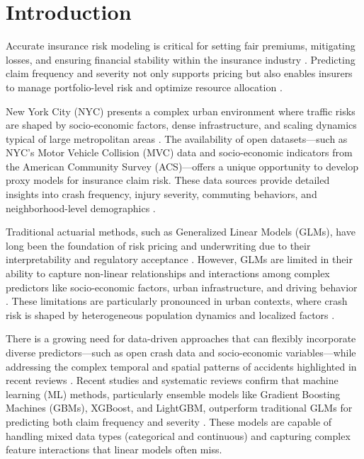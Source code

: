 \documentclass[
  number,
  review,
  3p]{elsarticle}
\begin{document}
\section{Introduction}\label{introduction}

Accurate insurance risk modeling is critical for setting fair premiums,
mitigating losses, and ensuring financial stability within the insurance
industry \citep{henckaerts, clemente}. Predicting claim frequency and
severity not only supports pricing but also enables insurers to manage
portfolio-level risk and optimize resource allocation \citep{mohamed}.

New York City (NYC) presents a complex urban environment where traffic
risks are shaped by socio-economic factors, dense infrastructure, and
scaling dynamics typical of large metropolitan areas
\citep{cabrera, bettencourt}. The availability of open datasets---such
as NYC's Motor Vehicle Collision (MVC) data and socio-economic
indicators from the American Community Survey (ACS)---offers a unique
opportunity to develop proxy models for insurance claim risk. These data
sources provide detailed insights into crash frequency, injury severity,
commuting behaviors, and neighborhood-level demographics
\citep{adeniyi, brubacher}.

Traditional actuarial methods, such as Generalized Linear Models (GLMs),
have long been the foundation of risk pricing and underwriting due to
their interpretability and regulatory acceptance \citep{henckaerts}.
However, GLMs are limited in their ability to capture non-linear
relationships and interactions among complex predictors like
socio-economic factors, urban infrastructure, and driving behavior
\citep{clemente}. These limitations are particularly pronounced in urban
contexts, where crash risk is shaped by heterogeneous population
dynamics and localized factors \citep{cabrera, brubacher}.

There is a growing need for data-driven approaches that can flexibly
incorporate diverse predictors---such as open crash data and
socio-economic variables---while addressing the complex temporal and
spatial patterns of accidents highlighted in recent reviews
\citep{grigorev, behboudi}. Recent studies and systematic reviews
confirm that machine learning (ML) methods, particularly ensemble models
like Gradient Boosting Machines (GBMs), XGBoost, and LightGBM,
outperform traditional GLMs for predicting both claim frequency and
severity \citep{clemente, mohamed, behboudi}. These models are capable
of handling mixed data types (categorical and continuous) and capturing
complex feature interactions that linear models often miss.
\end{document}
